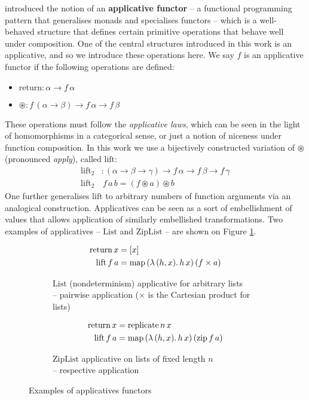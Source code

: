 \textcite{mcbride2008applicative} introduced the notion of an \textbf{applicative functor} -- a functional programming pattern that generalises monads and specialises functors -- which is a well-behaved structure that defines certain primitive operations that behave well under composition. One of the central structures introduced in this work is an applicative, and so we introduce these operations here. We say $f$ is an applicative functor if the following operations are defined:
\begin{itemize}
    \item $\mathrm{return} : \alpha \to f\,\alpha$
    \item $\circledast : f\,(\alpha \to \beta) \to f\,\alpha \to f\,\beta $
\end{itemize}
These operations must follow the \textit{applicative laws}, which can be seen in the light of homomorphisms in a categorical sense, or just a notion of niceness under function composition. In this work we use a bijectively constructed variation of $\circledast$ (pronounced \textit{apply}), called $\mathrm{lift}$:
\begin{align*}
\mathrm{lift}_2& : (\alpha \to \beta \to \gamma) \to f\,\alpha \to f\,\beta \to f\,\gamma \\ 
\mathrm{lift}_2&\,f\,a\,b = (f \circledast a) \circledast b
\end{align*}
One further generalises $\mathrm{lift}$ to arbitrary numbers of function arguments via an analogical construction. Applicatives can be seen as a sort of embellishment of values that allows application of similarly embellished transformations. Two examples of applicatives -- $\mathrm{List}$ and $\mathrm{ZipList}$ -- are shown on Figure \ref{fig:applicatives}.
%
\begin{figure}[h]
\centering
\begin{subfigure}{.5\textwidth}
  \centering
  \begin{align*}
\mathrm{return}\,x &= [x] \\
\mathrm{lift}\,f\,a &= \mathrm{map}\,(\lambda\,(h, x) \ldotp h\,x)\,(f \times a)
  \end{align*}
  \caption{$\mathrm{List}$ (nondeterminism) applicative for arbitrary lists \\ -- pairwise application ($\times$ is the Cartesian product for lists)}
\end{subfigure}%
\begin{subfigure}{.5\textwidth}
  \centering
  \begin{align*}
\mathrm{return}\,x &= \mathrm{replicate}\,n\,x \\
\mathrm{lift}\,f\,a &= \mathrm{map}\,(\lambda\,(h, x) \ldotp h\,x)\,(\mathrm{zip}\,f\,a)
  \end{align*}
  \caption{$\mathrm{ZipList}$ applicative on lists of fixed length $n$ \\ -- respective application}
\end{subfigure}
\caption{Examples of applicatives functors}
\label{fig:applicatives}
\end{figure}

